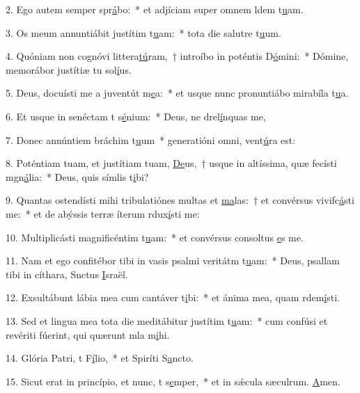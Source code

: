 2. Ego autem semper spr\uline{á}bo:~* et adjíciam super omnem ldem t\uline{u}am.\par 
3. Os meum annuntiábit justítim t\uline{u}am:~* tota die salutre t\uline{u}um.\par 
4. Quóniam non cognóvi littera\uline{tú}ram,~† introíbo in poténtis D\uline{ó}mini:~* Dómine, memorábor justítiæ tu sol\uline{í}us.\par 
5. Deus, docuísti me a juventút m\uline{e}a:~* et usque nunc pronuntiábo mirabíla t\uline{u}a.\par 
6. Et usque in senéctam t s\uline{é}nium:~* Deus, ne drel\uline{í}nquas me,\par 
7. Donec annúntiem bráchim t\uline{u}um~* generatióni omni,  vent\uline{ú}ra est:\par 
8. Poténtiam tuam, et justítiam tuam, \uline{De}us,~† usque in altíssima, quæ fecísti mgn\uline{á}lia:~* Deus, quis símlis t\uline{i}bi?\par 
9. Quantas ostendísti mihi tribulatiónes multas et \uline{ma}las:~† et convérsus vivifc\uline{á}sti me:~* et de abýssis terræ íterum rdux\uline{í}sti me:\par 
10. Multiplicásti magnificéntim t\uline{u}am:~* et convérsus consoltus \uline{e}s me.\par 
11. Nam et ego confitébor tibi in vasis psalmi veritátm t\uline{u}am:~* Deus, psallam tibi in cíthara, Snctus \uline{I}sraël.\par 
12. Exsultábunt lábia mea cum cantáver t\uline{i}bi:~* et ánima mea, quam rdem\uline{í}sti.\par 
13. Sed et lingua mea tota die meditábitur justítim t\uline{u}am:~* cum confúsi et revériti fúerint, qui quærunt mla m\uline{i}hi.\par 
14. Glória Patri, t F\uline{í}lio,~* et Spiríti S\uline{a}ncto.\par 
15. Sicut erat in princípio, et nunc, t s\uline{e}mper,~* et in sǽcula sæculrum. \uline{A}men.\par 
